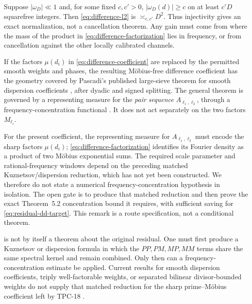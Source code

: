 \begin{remark}
Suppose \(|\omega_D|\ll1\) and, for some fixed \(c,c'>0\),
\(|\omega_D(d)|\ge c\) on at least \(c'D\) squarefree integers.  Then
\eqref{eq:difference-l2} is \(\asymp_{c,c'}D^2\).  Thus injectivity
gives an exact normalization, not a cancellation theorem.  Any gain
must come from where the mass of the product in
\eqref{eq:difference-factorization} lies in frequency, or from
cancellation against the other locally calibrated channels.
\end{remark}

If the factors \(\mu(d_i)\) in
\eqref{eq:difference-coefficient} are replaced by the permitted smooth
weights and phases, the resulting M\"obius-free difference coefficient
has the geometry covered by Pascadi's published large-sieve theorem
for smooth dispersion coefficients
\cite[Theorem~1.7]{Pascadi2026LargeSieve}, after dyadic and signed
splitting.  The general theorem is governed by a representing
measure for the \emph{pair sequence}
\(A_{\ell_1,\ell_2}\), through a frequency-concentration functional
\cite[Theorem~5.2]{Pascadi2026LargeSieve}.  It does not act separately
on the two factors \(M_{\ell_i}\).

\begin{remark}
\label{rem:mobius-concentration}
For the present coefficient, the representing measure for
\(A_{\ell_1,\ell_2}\) must encode the sharp factors \(\mu(d_i)\);
\eqref{eq:difference-factorization} identifies its Fourier density as
a product of two M\"obius exponential sums.  The required scale
parameter and rational-frequency windows depend on the preceding
matched Kuznetsov/dispersion reduction, which has not yet been
constructed.  We therefore do not state a numerical
frequency-concentration hypothesis in isolation.  The open gate is to
produce that matched reduction and then prove the exact
Theorem~5.2 concentration bound it requires, with sufficient saving for
\eqref{eq:residual-dd-target}.  This remark is a route specification,
not a conditional theorem.
\end{remark}

\begin{remark}
 is not by itself a theorem about the
original residual.  One must first produce a Kuznetsov or dispersion
formula in which the \(PP,PM,MP,MM\) terms share the same spectral
kernel and remain combined.  Only then can a frequency-concentration
estimate be applied.  Current results for smooth dispersion
coefficients, triply well-factorable weights, or separated bilinear
divisor-bounded weights do not supply that matched reduction for the
sharp prime--M\"obius coefficient left by TPC-18
\citep{Pascadi2025Distribution,Li2026v6}.
\end{remark}

